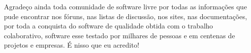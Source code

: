 Agradeço ainda toda comunidade de software livre por todas as informações que pude encontrar nos fóruns, nas listas de discussão, nos sites, nas documentações, por toda a conquista do software de qualidade obtida com o trabalho colaborativo, software esse testado por milhares de pessoas e em centenas de projetos e empresas. É nisso que eu acredito!



